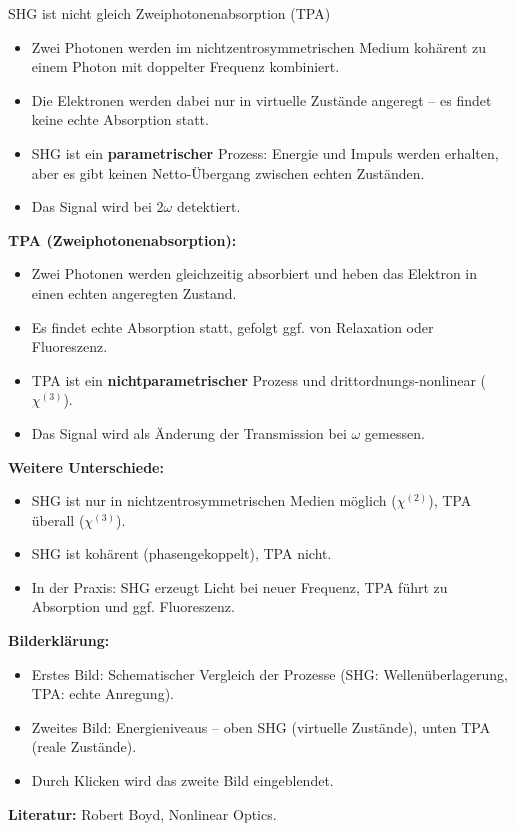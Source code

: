 \documentclass[notes=only]{beamer}
\begin{document}
\begin{frame}{SHG ist nicht gleich Zweiphotonenabsorption (TPA)}
{    \begin{itemize}
      \item Zwei Photonen werden im nichtzentrosymmetrischen Medium kohärent zu einem Photon mit doppelter Frequenz kombiniert.
      \item Die Elektronen werden dabei nur in virtuelle Zustände angeregt – es findet keine echte Absorption statt.
      \item SHG ist ein \textbf{parametrischer} Prozess: Energie und Impuls werden erhalten, aber es gibt keinen Netto-Übergang zwischen echten Zuständen.
      \item Das Signal wird bei $2\omega$ detektiert.
    \end{itemize}
    \textbf{TPA (Zweiphotonenabsorption):}
    \begin{itemize}
      \item Zwei Photonen werden gleichzeitig absorbiert und heben das Elektron in einen echten angeregten Zustand.
      \item Es findet echte Absorption statt, gefolgt ggf. von Relaxation oder Fluoreszenz.
      \item TPA ist ein \textbf{nichtparametrischer} Prozess und drittordnungs-nonlinear ($\chi^{(3)}$).
      \item Das Signal wird als Änderung der Transmission bei $\omega$ gemessen.
    \end{itemize}
    \textbf{Weitere Unterschiede:}
    \begin{itemize}
      \item SHG ist nur in nichtzentrosymmetrischen Medien möglich ($\chi^{(2)}$), TPA überall ($\chi^{(3)}$).
      \item SHG ist kohärent (phasengekoppelt), TPA nicht.
      \item In der Praxis: SHG erzeugt Licht bei neuer Frequenz, TPA führt zu Absorption und ggf. Fluoreszenz.
    \end{itemize}
    \textbf{Bilderklärung:}
    \begin{itemize}
      \item Erstes Bild: Schematischer Vergleich der Prozesse (SHG: Wellenüberlagerung, TPA: echte Anregung).
      \item Zweites Bild: Energieniveaus – oben SHG (virtuelle Zustände), unten TPA (reale Zustände).
      \item Durch Klicken wird das zweite Bild eingeblendet.
    \end{itemize}
    \textbf{Literatur:} Robert Boyd, Nonlinear Optics.
  }
\end{frame}
\end{document}
